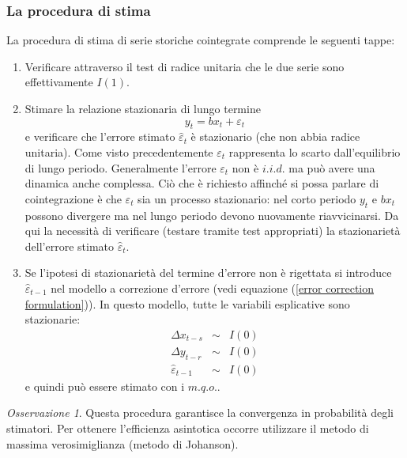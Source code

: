 \documentclass[a4paper]{report}
\newcounter{ese}
\theoremstyle{remark}
\newtheorem{remark}{Osservazione}
\newcounter{theor}
\begin{document}
\subsubsection{La procedura di stima}

La procedura di stima di serie storiche cointegrate comprende le seguenti
tappe:

\begin{enumerate}
\item Verificare attraverso il test di radice unitaria che le due serie sono
effettivamente $I(1)$.

\item Stimare la relazione stazionaria di lungo termine%
\begin{equation*}
y_{t}=bx_{t}+\varepsilon _{t}
\end{equation*}%
e verificare che l'errore stimato $\widehat{\varepsilon }_{t}$ \`{e}
stazionario (che non abbia radice unitaria). Come visto precedentemente $%
\varepsilon _{t}$ rappresenta lo scarto dall'equilibrio di lungo periodo.
Generalmente l'errore $\varepsilon _{t}$ non \`{e} $i.i.d.$ ma pu\`{o} avere
una dinamica anche complessa. Ci\`{o} che \`{e} richiesto affinch\'{e} si
possa parlare di cointegrazione \`{e} che $\varepsilon _{t}$ sia un processo
stazionario: nel corto periodo $y_{t}$ e $bx_{t}$ possono divergere ma nel
lungo periodo devono nuovamente riavvicinarsi. Da qui la necessit\`{a} di
verificare (testare tramite test appropriati) la stazionariet\`{a}
dell'errore stimato $\widehat{\varepsilon }_{t}$.

\item Se l'ipotesi di stazionariet\`{a} del termine d'errore non \`{e}
rigettata si introduce $\widehat{\varepsilon }_{t-1}$ nel modello a
correzione d'errore (vedi equazione (\ref{error correction formulation})).
In questo modello, tutte le variabili esplicative sono stazionarie:%
\begin{eqnarray*}
\Delta x_{t-s} &\sim &I(0) \\
\Delta y_{t-r} &\sim &I(0) \\
\widehat{\varepsilon }_{t-1} &\sim &I(0)
\end{eqnarray*}%
e quindi pu\`{o} essere stimato con i $m.q.o.$.
\end{enumerate}

\begin{remark}
Questa procedura garantisce la convergenza in probabilit\`{a} degli
stimatori. Per ottenere l'efficienza asintotica occorre utilizzare il metodo
di massima verosimiglianza (metodo di Johanson).
\end{remark}
\end{document}
